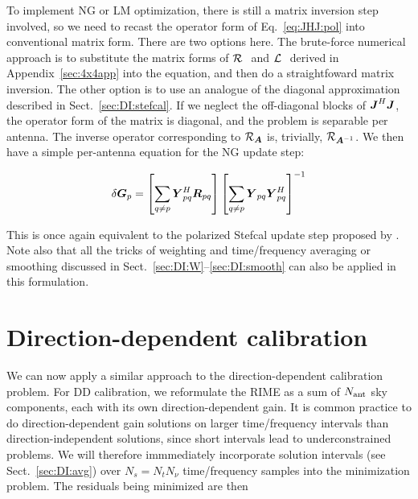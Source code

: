 \documentclass[useAMS,usenatbib]{mn2e}
\newcommand{\mat}[1]{{\bmath{#1}}}
\newcommand{\JJ}{\mat{J}} %
\newcommand{\MM}{\mat{M}}
\newcommand{\RR}{\mat{R}}
\newcommand{\GG}{\mat{G}}
\newcommand{\JHJ}{\JJ^H\JJ} %
\begin{document}
To implement NG or LM optimization, there is still a matrix inversion step involved, so we need to recast the operator 
form of Eq.~\ref{eq:JHJ:pol} into conventional matrix form. There are two options here. The brute-force numerical
approach is to substitute the matrix forms of $\mathcal{R}_{{~}}$ and $\mathcal{L}_{{~}}$ derived in Appendix~\ref{sec:4x4app} into the equation, 
and then do a straightfoward matrix inversion. The other option is to use an analogue of the diagonal approximation described in 
Sect.~\ref{sec:DI:stefcal}. If we neglect the off-diagonal blocks of $\JHJ$, the operator form of the matrix is 
diagonal, and the problem is separable per antenna. The inverse operator corresponding to $\Rop{\mat{A}}$ is, 
trivially, $\Rop{\mat{A}^{-1}}$. We then have a simple per-antenna equation for the NG update step:

\begin{equation}
\label{eq:update:DI:diag:pol}
\delta \GG_p = \left [ \sum\limits_{q\ne p} \YY^H_{pq} \RR_{pq} \right ] 
\left [ \sum\limits_{q\ne p} \YY_{pq} \YY^H_{pq}  \right ]^{-1}
\end{equation}

This is once again equivalent to the polarized Stefcal update step proposed by \citet{Stefcal}. Note also that all 
the tricks of weighting and time/frequency averaging or smoothing discussed in Sect.~\ref{sec:DI:W}--\ref{sec:DI:smooth} 
can also be applied in this formulation.


\section{Direction-dependent calibration}

\newcommand{\Ns}{N_s}

We can now apply a similar approach to the direction-dependent calibration problem. For DD calibration, we reformulate
the RIME as a sum of $N_\mathrm{ant}$ sky components, each with its own direction-dependent gain. 
It is common practice to do direction-dependent gain solutions on larger time/frequency intervals than direction-independent 
solutions, since short intervals lead to underconstrained
problems. We will therefore immmediately incorporate solution intervals (see Sect.~\ref{sec:DI:avg}) 
over $\Ns=N_t N_\nu$ time/frequency samples into the  minimization problem. The residuals being minimized
are then

\newcommand{\GGd}{\GG^{(d)}}
\newcommand{\GGdH}{\GG^{(d)H}}
\newcommand{\MMd}{\MM^{(d)}}
\newcommand{\YYd}{\YY^{(d)}}
\newcommand{\YYdH}{\YY^{(d)H}}
\newcommand{\YYc}{\YY^{(c)}}
\newcommand{\YYcH}{\YY^{(c)H}}
\newcommand{\ggd}{g^{(d)}}
\newcommand{\ggdH}{\bar{g}^{(d)}}
\newcommand{\ggc}{g^{(c)}}
\newcommand{\ggcH}{\bar{g}^{(c)}}
\newcommand{\mmc}{m^{(c)}}
\newcommand{\mmd}{m^{(d)}}
\newcommand{\mmcH}{\bar{m}^{(c)}}
\newcommand{\mmdH}{\bar{m}^{(d)}}
\newcommand{\yyd}{y^{(d)}}
\newcommand{\yydH}{\bar{y}^{(d)}}
\newcommand{\yyc}{y^{(c)}}
\newcommand{\yycH}{\bar{y}^{(c)}}
\end{document}
